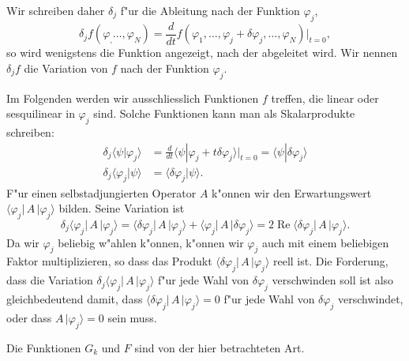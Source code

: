 Wir schreiben daher $\delta_j$ f"ur die Ableitung nach der Funktion $\varphi_j$,
\[
\delta_j f(\varphi_,\dots,\varphi_N)
=
\frac{d}{dt}f(\varphi_1,\dots,\varphi_j+\delta\varphi_j,\dots,\varphi_N)\bigg|_{t=0},
\]
so wird wenigstens die Funktion angezeigt, nach der abgeleitet wird.
Wir nennen $\delta_j f$ die Variation von $f$ nach der Funktion $\varphi_j$.

Im Folgenden werden wir ausschliesslich Funktionen $f$ treffen, die 
linear oder sesquilinear in $\varphi_j$ sind. Solche Funktionen
kann man als Skalarprodukte schreiben:
\begin{align*}
\delta_j\langle\psi|\varphi_j\rangle
&=
\frac{d}{dt}
\langle\psi|\varphi_j+t\delta\varphi_j\rangle\bigg|_{t=0}
=
\langle\psi|\delta\varphi_j\rangle
\\
\delta_j\langle\varphi_j|\psi\rangle
&=
\langle\delta\varphi_j|\psi\rangle.
\end{align*}
F"ur einen selbstadjungierten Operator $A$ k"onnen wir den Erwartungswert
$\langle\varphi_j|\,A\,|\varphi_j\rangle$ bilden.
Seine Variation ist
\[
\delta_j\langle\varphi_j|\,A\,|\varphi_j\rangle
=
\langle\delta\varphi_j|\,A\,|\varphi_j\rangle
+
\langle\varphi_j|\,A\,|\delta\varphi_j\rangle
=
2\operatorname{Re}\langle\delta\varphi_j|\,A\,|\varphi_j\rangle.
\]
Da wir $\varphi_j$ beliebig w"ahlen k"onnen, k"onnen wir $\varphi_j$
auch mit einem beliebigen Faktor multiplizieren, so dass das
Produkt $\langle\delta\varphi_j|\,A\,|\varphi_j\rangle$ reell ist.
Die Forderung, dass die Variation
$\delta_j\langle\varphi_j|\,A\,|\varphi_j\rangle$
f"ur jede Wahl von $\delta\varphi_j$
verschwinden soll ist also gleichbedeutend damit, dass
$\langle\delta\varphi_j|\,A\,|\varphi_j\rangle=0$
f"ur jede Wahl von $\delta\varphi_j$ verschwindet, oder dass
$A\,|\varphi_j\rangle=0$ sein muss.

Die Funktionen $G_k$ und $F$ sind von der hier betrachteten Art.

